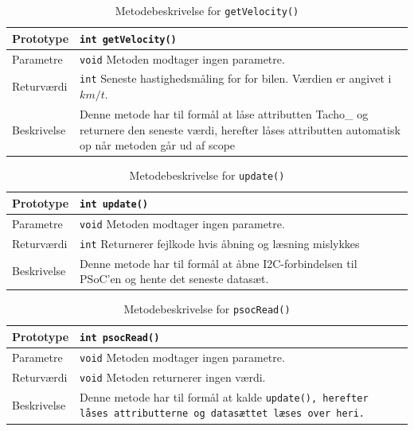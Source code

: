 \begin{table}[h]
	\begin{tabularx}{\textwidth}{| L{2.5 cm} | Z |} \hline
		Prototype 	& \texttt{int getVelocity()} \\\hline
		Parametre 	& \texttt{void} \newline Metoden modtager ingen parametre. \\\hline
		Returværdi 	& \texttt{int}  \newline Seneste hastighedsmåling for for bilen. Værdien er angivet i $km/t$. \\\hline
		Beskrivelse	& Denne metode har til formål at låse attributten Tacho\_ og returnere den seneste værdi, herefter låses attributten automatisk op når metoden går ud af scope \\\hline	
	\end{tabularx}
	\caption{Metodebeskrivelse for  \texttt{getVelocity()}}
	\label{table:met_getvelocity}
\end{table}

\begin{table}[h]
	\begin{tabularx}{\textwidth}{| L{2.5 cm} | Z |} \hline
		Prototype 	& \texttt{int update()} \\\hline
		Parametre 	& \texttt{void} \newline Metoden modtager ingen parametre. \\\hline
		Returværdi 	& \texttt{int}  \newline Returnerer fejlkode hvis åbning og læsning mislykkes \\\hline
		Beskrivelse	& Denne metode har til formål at åbne I2C-forbindelsen til PSoC'en og hente det seneste datasæt. \\\hline
	\end{tabularx}
	\caption{Metodebeskrivelse for  \texttt{update()}}
	\label{table:met_update}
\end{table}
\clearpage

\begin{table}[h]
	\begin{tabularx}{\textwidth}{| L{2.5 cm} | Z |} \hline
		Prototype 	& \texttt{int psocRead()} \\\hline
		Parametre 	& \texttt{void} \newline Metoden modtager ingen parametre. 	\\\hline
		Returværdi 	& \texttt{void} \newline Metoden returnerer ingen værdi. 	\\\hline
		Beskrivelse	& Denne metode har til formål at kalde \texttt{update(), herefter låses attributterne og datasættet læses over heri.}\\\hline
	\end{tabularx}
	\caption{Metodebeskrivelse for  \texttt{psocRead()}}
	\label{table:met_psocRead}
\end{table}
\clearpage